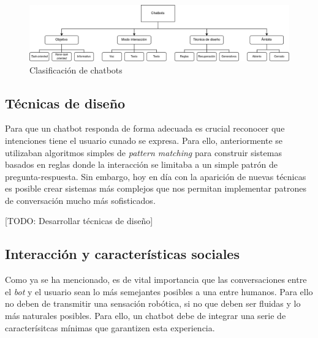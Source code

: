 \begin{figure}[htbp]
\centering
\includegraphics[scale=0.25]{../images/clasificacionChatbots.png} 
\caption{Clasificación de chatbots}
\label{fig:x clasificacion chatbots}
\end{figure}

 
 
\subsection{Técnicas de diseño }
\label{tecnicas diseño}
Para que un chatbot responda de forma adecuada es crucial reconocer que intenciones tiene el usuario cunado se expresa. Para ello, anteriormente se utilizaban algoritmos simples de \textit{pattern matching} para construir sistemas basados en reglas donde la interacción se limitaba a un simple patrón de pregunta-respuesta. Sin embargo, hoy en día con la aparición de nuevas técnicas es posible crear sistemas más complejos que nos permitan implementar patrones de conversación mucho más sofisticados.%


[TODO: Desarrollar técnicas de diseño]


\subsection{Interacción y características sociales}
Como ya se ha mencionado, es de vital importancia que las conversaciones entre el \textit{bot} y el usuario sean lo más semejantes posibles a una entre humanos. Para ello no deben de transmitir una sensación robótica, si no que deben ser fluidas y lo más naturales posibles. Para ello, un chatbot debe de integrar una serie de caracterísitcas mínimas que garantizen esta experiencia.\\


